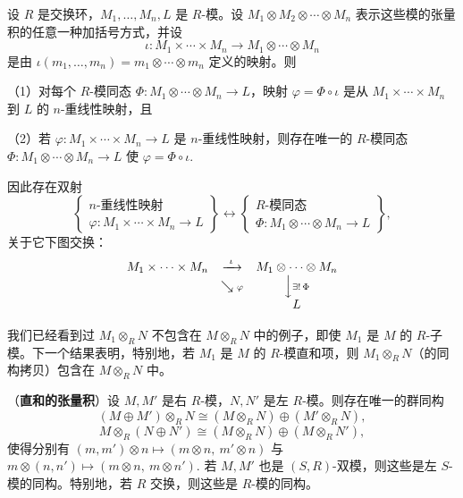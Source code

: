 \begin{corollary}\label{cor:10.16}
设 \(R\) 是交换环，\(M_1, \ldots, M_n, L\) 是 \(R\)-模。设 \(M_1 \otimes M_2 \otimes \cdots \otimes M_n\) 表示这些模的张量积的任意一种加括号方式，并设
\[
\iota : M_1 \times \cdots \times M_n \to M_1 \otimes \cdots \otimes M_n
\]
是由 \(\iota(m_1, \ldots, m_n) = m_1 \otimes \cdots \otimes m_n\) 定义的映射。则

（1）对每个 \(R\)-模同态 \(\Phi : M_1 \otimes \cdots \otimes M_n \to L\)，映射 \(\varphi = \Phi \circ \iota\) 是从 \(M_1 \times \cdots \times M_n\) 到 \(L\) 的 \(n\)-重线性映射，且

（2）若 \(\varphi : M_1 \times \cdots \times M_n \to L\) 是 \(n\)-重线性映射，则存在唯一的 \(R\)-模同态 \(\Phi : M_1 \otimes \cdots \otimes M_n \to L\) 使 \(\varphi = \Phi \circ \iota\).

因此存在双射
\[
\left\{\begin{array}{c} n\text{-重线性映射} \\ \varphi : M_1 \times \cdots \times M_n \to L\end{array}\right\}
\longleftrightarrow
\left\{\begin{array}{c} R\text{-模同态} \\ \Phi : M_1 \otimes \cdots \otimes M_n \to L\end{array}\right\},
\]
关于它下图交换：
\[
\begin{array}{ccc}
M_1 \times \cdots \times M_n & \xrightarrow{\ \iota\ } & M_1 \otimes \cdots \otimes M_n \\
& \searrow{\scriptstyle \varphi} & \Big\downarrow{\scriptstyle \exists!\,\Phi} \\
& & L
\end{array}
\]
\end{corollary}

我们已经看到过 \(M_1 \otimes_R N\) 不包含在 \(M \otimes_R N\) 中的例子，即使 \(M_1\) 是 \(M\) 的 \(R\)-子模。下一个结果表明，特别地，若 \(M_1\) 是 \(M\) 的 \(R\)-模直和项，则 \(M_1 \otimes_R N\)（的同构拷贝）包含在 \(M \otimes_R N\) 中。

\begin{theorem}\label{thm:10.17}
（\textbf{直和的张量积}）设 \(M, M'\) 是右 \(R\)-模，\(N, N'\) 是左 \(R\)-模。则存在唯一的群同构
\[
(M \oplus M') \otimes_R N \cong (M \otimes_R N) \oplus (M' \otimes_R N),
\]
\[
M \otimes_R (N \oplus N') \cong (M \otimes_R N) \oplus (M \otimes_R N'),
\]
使得分别有 \((m, m') \otimes n \mapsto (m \otimes n,\ m' \otimes n)\) 与 \(m \otimes (n, n') \mapsto (m \otimes n,\ m \otimes n')\). 若 \(M, M'\) 也是 \((S, R)\)-双模，则这些是左 \(S\)-模的同构。特别地，若 \(R\) 交换，则这些是 \(R\)-模的同构。
\end{theorem}

